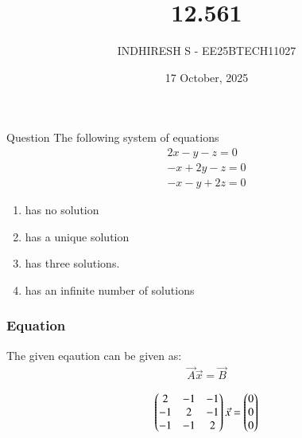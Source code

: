 \documentclass{beamer}
\title %
    {12.561}
\date{17 October, 2025}
\author %
    {INDHIRESH S - EE25BTECH11027}
\begin{document}
    
    \frame{\titlepage}
    
    \begin{frame}{Question}
  The following system of equations
\begin{align*}
    2x-y-z=0\\
    -x+2y-z=0\\
    -x-y+2z=0
\end{align*}
\begin{enumerate}
    \item has no solution
    \item  has a unique solution
    \item  has three solutions.
    \item has an infinite number of solutions
\end{enumerate}
    \end{frame}
    
    \begin{frame}[allowframebreaks] 
    \frametitle{Equation}
        \centering
        \label{tab:parameters}
  The given eqaution can be given as:
\begin{align}
 \Vec{A}\Vec{x}=\Vec{B}
\end{align}


\begin{align}
  \begin{pmatrix}2&-1&-1\\-1&2&-1\\-1&-1&2\end{pmatrix}\Vec{x}=\begin{pmatrix}0\\0\\0\end{pmatrix}
\end{align}

    \end{frame}
    
\end{document}
